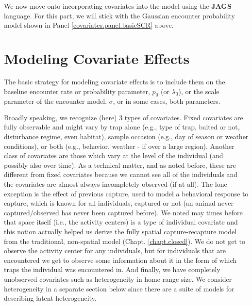 We now move onto incorporating covariates into the model using the
{\bf JAGS} language.  For this part, we will stick with the Gaussian
encounter probability model shown in Panel
\ref{covariates.panel.basicSCR} above.


\section{Modeling Covariate Effects}

The basic strategy for modeling covariate effects is to include them
on the baseline encounter rate or probability parameter, $p_{0}$ (or
$\lambda_{0}$), or the scale parameter of the encounter model,
$\sigma$, or in some cases, both parameters.

Broadly speaking, we recognize (here) 3 types of covariates. Fixed
covariates are fully observable and might vary by trap alone
(e.g., type of trap, baited or not, disturbance regime, even habitat),
sample occasion (e.g., day of season or weather conditions), or both
(e.g., behavior, weather - if over a large region).  Another class
of covariates are those which vary at the level of the individual (and
possibly also over time).  As a technical matter, and as noted before,
these are different from fixed covariates because we cannot see all of
the individuals and the covariates are almost always incompletely
observed (if at all).  The lone exception is the effect of previous
capture, used to model a behavioral response
to capture, which is known for all individuals, captured or not (an
animal never captured/observed has never been captured before).  We
noted may times before that space itself (i.e., the activity centers)
is a type of individual covariate and this notion actually helped us
derive the fully spatial capture-recapture model from the traditional,
non-spatial model (Chapt. \ref{chapt.closed}). We do not get to observe
the activity center for any individuals, but for individuals that are
encountered we get to observe some information about it in the form of
which traps the individual was encountered in.  And finally, we have
completely unobserved covariates such as heterogeneity in home range
size.  We consider heterogeneity in a separate section below since 
there are 
a suite of models for describing  latent heterogeneity. 

